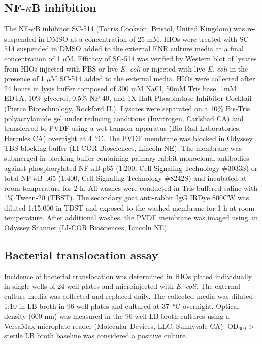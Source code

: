 \documentclass[9pt,lineo]{elife}
\begin{document}
\subsection*{{\bfseries\sffamily } NF-\(\kappa\)B inhibition}
\label{sec:orgheadline18}
The NF-\(\kappa\)B inhibitor SC-514 \citep{Kishore:2003,Litvak:2009} (Tocris Cookson, Bristol, United Kingdom) was re-suspended in DMSO at a concentration of 25 mM. HIOs were treated with SC-514 suspended in DMSO added to the external ENR culture media at a final concentration of 1 \(\mu\)M. Efficacy of SC-514 was verified by Western blot of lysates from HIOs injected with PBS or live \emph{E. coli} or injected with live \emph{E. coli} in the presence of 1 \(\mu\)M SC-514 added to the external media. HIOs were collected after 24 hours in lysis buffer composed of 300 mM NaCl, 50mM Tris base, 1mM EDTA, 10\% glycerol, 0.5\% NP-40, and 1X Halt Phosphatase Inhibitor Cocktail (Pierce Biotechnology, Rockford IL). Lysates were separated on a 10\% Bis-Tris polyacrylamide gel under reducing conditions (Invitrogen, Carlsbad CA) and transferred to PVDF using a wet transfer apparatus (Bio-Rad Laboratories, Hercules CA) overnight at \SI{4}{\celsius}. The PVDF membrane was blocked in Odyssey TBS blocking buffer (LI-COR Biosciences, Lincoln NE). The membrane was submerged in blocking buffer containing primary rabbit monoclonal antibodies against phosphorylated NF-\(\kappa\)B p65 (1:200, Cell Signaling Technology \#3033S) or total NF-\(\kappa\)B p65 (1:400, Cell Signaling Technology \#8242S) and incubated at room temperature for 2 h. All washes were conducted in Tris-buffered saline with 1\% Tween-20 (TBST). The secondary goat anti-rabbit IgG IRDye 800CW was diluted 1:15,000 in TBST and exposed to the washed membrane for 1 h at room temperature. After additional washes, the PVDF membrane was imaged using an Odyssey Scanner (LI-COR Biosciences, Lincoln NE).
\subsection*{{\bfseries\sffamily } Bacterial translocation assay}
\label{sec:orgheadline19}
Incidence of bacterial translocation was determined in HIOs plated individually in single wells of 24-well plates and microinjected with \emph{E. coli}. The external culture media was collected and replaced daily. The collected media was diluted 1:10 in LB broth in 96 well plates and cultured at \SI{37}{\celsius} overnight. Optical density (600 nm) was measured in the 96-well LB broth cultures using a VersaMax microplate reader (Molecular Devices, LLC, Sunnyvale CA). OD\(_{\text{600}}\) > sterile LB broth baseline was considered a positive culture. 
\end{document}
